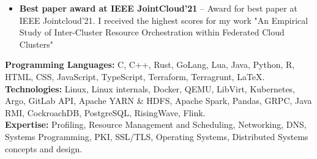 \documentclass[10pt,a4paper]{base}
\begin{document}
\begin{fullwidth}
\begin{itemize}
  \item \textbf{Best paper award at IEEE JointCloud'21} -- Award for best paper at IEEE Jointcloud'21. I received the highest scores for my work "An Empirical Study of Inter-Cluster Resource Orchestration within Federated Cloud Clusters"
\end{itemize}


\textbf{Programming Languages:} C, C++, Rust, GoLang, Lua, Java, Python, R, HTML, CSS, JavaScript, TypeScript, Terraform, Terragrunt, \LaTeX. \\
\textbf{Technologies:} Linux, Linux internals, Docker, QEMU, LibVirt, Kubernetes, Argo, GitLab API, Apache YARN \& HDFS, Apache Spark, Pandas, GRPC, Java RMI, CockroachDB, PostgreSQL, RisingWave, Flink.\\
\textbf{Expertise:} Profiling, Resource Management and Scheduling, Networking, DNS, Systems Programming, PKI, SSL/TLS, Operating Systems, Distributed Systems concepts and design. \\

\end{fullwidth}
\end{document}
